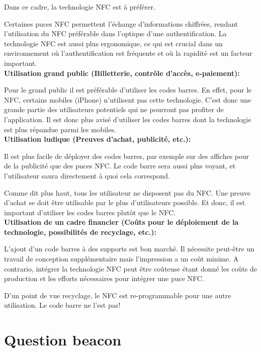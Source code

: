 \documentclass[12pt]{article}
\begin{document}
Dans ce cadre, la technologie NFC est à préférer.

Certaines puces NFC permettent l'échange d'informations chiffrées, rendant l'utilisation du NFC préférable dans l'optique d'une authentification.
La technologie NFC est aussi plus ergonomique, ce qui est crucial dans un environnement où l'authentification est fréquente et où la rapidité est un facteur important. \\

\textbf{Utilisation grand public (Billetterie, contrôle d'accès, e-paiement):} \medskip

Pour le grand public il est préférable d'utiliser les codes barres. En effet, pour le NFC, certains mobiles (iPhone) n'utilisent pas cette technologie. C'est donc une grande partie des utilisateurs potentiels qui ne pourront pas profiter de l'application. Il est donc plus avisé d'utiliser les codes barres dont la technologie est plus répandue parmi les mobiles.\\

\textbf{Utilisation ludique (Preuves d'achat, publicité, etc.):}
\medskip

Il est plus facile de déployer des codes barres, par exemple sur des affiches pour de la publicité que des puces NFC. Le code  barre sera aussi plus voyant, et l'utilisateur saura directement à quoi cela correspond.

Comme dit plus haut, tous les utilisateur ne disposent pas du NFC.
Une preuve d'achat se doit être utilisable par le plus d'utilisateurs possible. Et donc, il est important d'utiliser les codes barres plutôt que le NFC. \\

\textbf{Utilisation de un cadre financier (Coûts pour le déploiement de la technologie, possibilités de recyclage, etc.):}
\medskip

L'ajout d'un code barres à des supports est bon marché. Il nécessite peut-être un travail de conception supplémentaire mais l'impression a un coût minime.
A contrario, intégrer la technologie NFC peut être coûteuse étant donné les coûts de production et les efforts nécessaires pour intégrer une puce NFC.

D'un point de vue recyclage, le NFC est re-programmable pour une autre utilisation. Le code barre ne l'est pas!

\clearpage
\section*{Question beacon}
\end{document}
